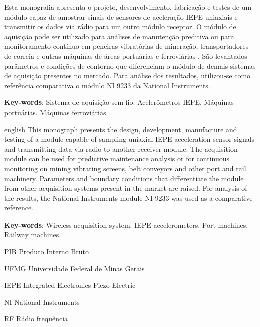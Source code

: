 \documentclass[11pt]{abntex2}
\begin{document}
\makeatletter
	\imprimircapa
	\imprimirfolhaderosto

	\begin{resumo}
		Esta monografia apresenta o projeto, desenvolvimento, fabricação e testes de um módulo capaz de amostrar sinais de sensores de aceleração IEPE uniaxiais e transmitir os dados via rádio para um outro módulo receptor. O módulo de aquisição pode ser utilizado para análises de manutenção preditiva ou para monitoramento contínuo em peneiras vibratórias de mineração, transportadores de correia e outras máquinas de áreas portuárias e ferroviárias . São levantados parâmetros e condições de contorno que diferenciam o módulo de demais sistemas de aquisição presentes no mercado. Para análise dos resultados, utilizou-se como referência comparativa o módulo NI 9233 da National Instruments.

		\vspace{\onelineskip}

		\noindent 
		\textbf{Key-words}: Sistema de aquisição sem-fio. Acelerômetros IEPE. Máquinas portuárias. Máquinas ferroviárias.
	\end{resumo}

	\begin{resumo}[Abstract]
		\begin{otherlanguage*}{english}
			This monograph presents the design, development, manufacture and testing of a module capable of sampling uniaxial IEPE acceleration sensor signals and transmitting data via radio to another receiver module. The acquisition module can be used for predictive maintenance analysis or for continuous monitoring on mining vibrating screens, belt conveyors and other port and rail machinery. Parameters and boundary conditions that differentiate the module from other acquisition systems present in the market are raised. For analysis of the results, the National Instruments module NI 9233 was used as a comparative reference.

			\vspace{\onelineskip}
			
			\noindent 
			\textbf{Key-words}: Wireless acquisition system. IEPE accelerometers. Port machines. Railway machines.
		\end{otherlanguage*}
	\end{resumo}

	\tableofcontents
	\newpage
	\listoffigures
	\cleardoublepage
	\begin{siglas}
		\item[PIB] Produto Interno Bruto
		\item[UFMG] Universidade Federal de Minas Gerais
		\item[IEPE] Integrated Electronics Piezo-Electric
		\item[NI] National Instruments
		\item[RF] Rádio frequência
	\end{siglas}
	\newpage
	
\end{document}

